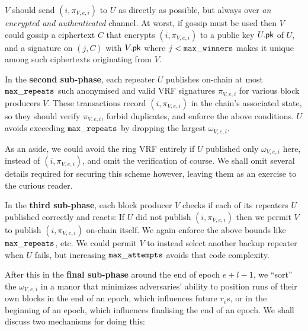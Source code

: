 $V$ should send $(i,\pi_{V,e,i})$ to $U$ as directly as possible, but always over \emph{an encrypted and authenticated} channel.  At worst, if gossip must be used then $V$ could gossip a ciphertext $C$ that encrypts $(i,\pi_{V,e,i})$ to a public key $U.\mathsf{pk}$ of $U$, and a signature on $(j,C)$ with $V.\mathsf{pk}$ where $j < \mathtt{max\_winners}$ makes it unique among such ciphertexts originating from $V$.  

In the {\bf second sub-phase}, each repeater $U$ publishes on-chain at most $\mathtt{max\_repeats}$ such anonymised and valid VRF signatures $\pi_{V,e,i}$ for various block producers $V$.  These transactions record $(i,\pi_{V,e,i})$ in the chain's associated state, so they should verify $\pi_{V,e,i}$, forbid duplicates, and enforce the above conditions.  $U$ avoids exceeding $\mathtt{max\_repeats}$ by dropping the largest $\omega_{V,e,i}$.

As an aside, we could avoid the ring VRF entirely if $U$ published only $\omega_{V,e,i}$ here, instead of $(i,\pi_{V,e,i})$, and omit the verification of course.  We shall omit several details required for securing this scheme however, leaving them as an exercise to the curious reader.

In the {\bf third sub-phase}, each block producer $V$ checks if each of its repeaters $U$ published correctly and reacts:  If $U$ did not publish $(i,\pi_{V,e,i})$ then we permit $V$ to publish $(i,\pi_{V,e,i})$ on-chain itself.  We again enforce the above bounds like $\mathtt{max\_repeats}$, etc.  We could permit $V$ to instead select another backup repeater when $U$ fails, but increasing $\mathtt{max\_attempts}$ avoids that code complexity.

After this in the {\bf final sub-phase} around the end of epoch $e+l-1$, we ``sort'' the $\omega_{V,e,i}$ in a manor that minimizes adversaries' ability to position runs of their own blocks in the end of an epoch, which influences future $r_e$s, or in the beginning of an epoch, which influences finalising the end of an epoch.  We shall discuss two mechanisms for doing this: 

